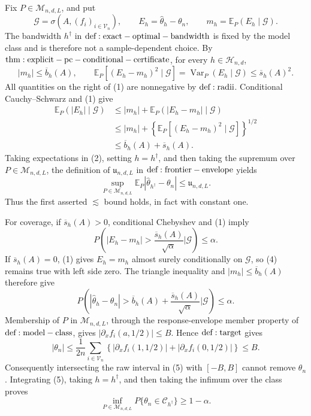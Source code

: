 Fix \(P\in\mathcal M_{n,d,L}\), and put
\[
 \mathcal G=\sigma\!\left(A,(f_i)_{i\in\mathcal V_n}\right),
 \qquad
 E_h=\widehat\theta_h-\theta_n,
 \qquad
 m_h=\mathbb E_P(E_h\mid\mathcal G).
\]
The bandwidth \(h^\dagger\) in \({\rm def:exact-optimal-bandwidth}\) is fixed by the model class and is therefore not a sample-dependent choice.  By \({\rm thm:explicit-pc-conditional-certificate}\), for every \(h\in\mathcal H_{n,d}\),
\[
 |m_h|\leq\overline b_h(A),
 \qquad
 \mathbb E_P\!\left[(E_h-m_h)^2\mid\mathcal G\right]
 =\operatorname{Var}_P(E_h\mid\mathcal G)
 \leq\overline s_h(A)^2.
\tag{1}
\]
All quantities on the right of (1) are nonnegative by \({\rm def:radii}\).  Conditional Cauchy--Schwarz and (1) give
\[
\begin{aligned}
 \mathbb E_P(|E_h|\mid\mathcal G)
 &\leq |m_h|+\mathbb E_P(|E_h-m_h|\mid\mathcal G)\\
 &\leq |m_h|+
 \left\{\mathbb E_P[(E_h-m_h)^2\mid\mathcal G]\right\}^{1/2}\\
 &\leq\overline b_h(A)+\overline s_h(A).
\end{aligned}
\tag{2}
\]
Taking expectations in (2), setting \(h=h^\dagger\), and then taking the supremum over \(P\in\mathcal M_{n,d,L}\), the definition of \(\mathfrak u_{n,d,L}\) in \({\rm def:frontier-envelope}\) yields
\[
 \sup_{P\in\mathcal M_{n,d,L}}
 \mathbb E_P|\widehat\theta_{h^\dagger}-\theta_n|
 \leq\mathfrak u_{n,d,L}.
\tag{3}
\]
Thus the first asserted \(\lesssim\) bound holds, in fact with constant one.

For coverage, if \(\overline s_h(A)>0\), conditional Chebyshev and (1) imply
\[
 P\!\left(
 |E_h-m_h|>\frac{\overline s_h(A)}{\sqrt\alpha}
 \mathrel{\Big|}\mathcal G
 \right)\leq\alpha.
\tag{4}
\]
If \(\overline s_h(A)=0\), (1) gives \(E_h=m_h\) almost surely conditionally on \(\mathcal G\), so (4) remains true with left side zero.  The triangle inequality and \(|m_h|\leq\overline b_h(A)\) therefore give
\[
 P\!\left(
 |\widehat\theta_h-\theta_n|>
 \overline b_h(A)+\frac{\overline s_h(A)}{\sqrt\alpha}
 \mathrel{\Big|}\mathcal G
 \right)\leq\alpha.
\tag{5}
\]
Membership of \(P\) in \(\mathcal M_{n,d,L}\), through the response-envelope member property of \({\rm def:model-class}\), gives \(|\partial_x f_i(a,1/2)|\leq B\).  Hence \({\rm def:target}\) gives
\[
 |\theta_n|
 \leq\frac1{2n}\sum_{i\in\mathcal V_n}
 \left\{|\partial_x f_i(1,1/2)|+|\partial_x f_i(0,1/2)|\right\}
 \leq B.
\tag{6}
\]
Consequently intersecting the raw interval in (5) with \([-B,B]\) cannot remove \(\theta_n\).  Integrating (5), taking \(h=h^\dagger\), and then taking the infimum over the class proves
\[
 \inf_{P\in\mathcal M_{n,d,L}}
 P\{\theta_n\in\mathcal C_{h^\dagger}\}\geq1-\alpha.
\tag{7}
\]

